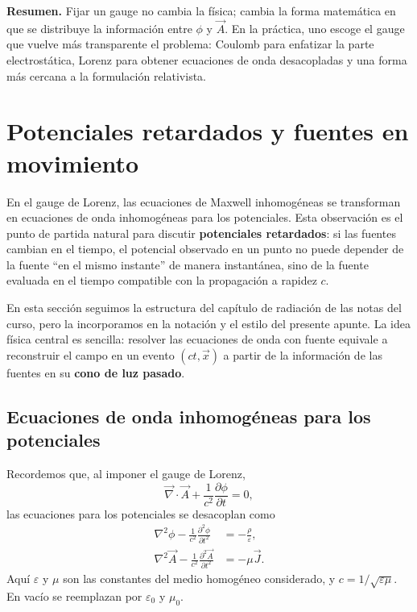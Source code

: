 \documentclass[12pt,a4paper]{article}
\theoremstyle{definition}
\theoremstyle{plain}
\numberwithin{equation}{section}
\theoremstyle{remark}
\begin{document}
\begin{cajaidea}
\textbf{Resumen.} Fijar un gauge no cambia la física; cambia la forma matemática en que se distribuye la información entre $\phi$ y $\vec A$. En la práctica, uno escoge el gauge que vuelve más transparente el problema: Coulomb para enfatizar la parte electrostática, Lorenz para obtener ecuaciones de onda desacopladas y una forma más cercana a la formulación relativista.
\end{cajaidea}

\section{Potenciales retardados y fuentes en movimiento}
\label{sec:potenciales-retardados-fuentes-movimiento}

En el gauge de Lorenz, las ecuaciones de Maxwell inhomogéneas se transforman en ecuaciones de onda inhomogéneas para los potenciales. Esta observación es el punto de partida natural para discutir \textbf{potenciales retardados}: si las fuentes cambian en el tiempo, el potencial observado en un punto no puede depender de la fuente ``en el mismo instante'' de manera instantánea, sino de la fuente evaluada en el tiempo compatible con la propagación a rapidez $c$.

En esta sección seguimos la estructura del capítulo de radiación de las notas del curso, pero la incorporamos en la notación y el estilo del presente apunte. La idea física central es sencilla: resolver las ecuaciones de onda con fuente equivale a reconstruir el campo en un evento $(ct,\vec x)$ a partir de la información de las fuentes en su \textbf{cono de luz pasado}.

\subsection{Ecuaciones de onda inhomogéneas para los potenciales}
\label{subsec:onda-inhomogenea-potenciales}

Recordemos que, al imponer el gauge de Lorenz,
\begin{equation*}
    \vec\nabla\cdot\vec A+\frac{1}{c^2}\frac{\partial\phi}{\partial t}=0,
\end{equation*}
las ecuaciones para los potenciales se desacoplan como
\begin{align}
    \nabla^2\phi-\frac{1}{c^2}\frac{\partial^2\phi}{\partial t^2}
    &=-\frac{\rho}{\varepsilon},
    \label{eq:rad-onda-phi}\\
    \nabla^2\vec A-\frac{1}{c^2}\frac{\partial^2\vec A}{\partial t^2}
    &=-\mu\vec J.
    \label{eq:rad-onda-A}
\end{align}
Aquí $\varepsilon$ y $\mu$ son las constantes del medio homogéneo considerado, y $c=1/\sqrt{\varepsilon\mu}$. En vacío se reemplazan por $\varepsilon_0$ y $\mu_0$.
\end{document}
